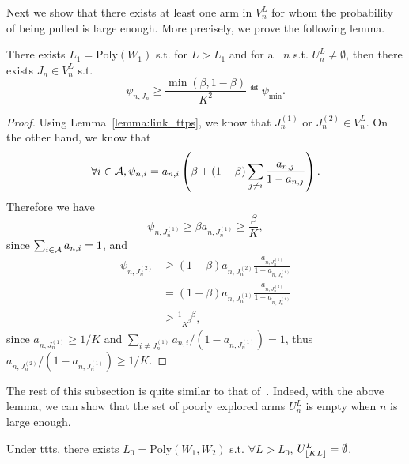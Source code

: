 Next we show that there exists at least one arm in $V_n^L$ for whom the probability of being pulled is large enough. More precisely, we prove the following lemma.

\begin{lemma}\label{lemma:psi_min_ttts}
\begin{leftbar}[lemmabar]
    There exists $L_1 = \text{Poly}(W_1)$ s.t. for $L > L_1$ and for all $n$ s.t. $U_n^L \neq \emptyset$, then there exists $J_n \in V_n^L$ s.t.
    \[
        \psi_{n,J_n} \geq \frac{\min(\beta,1-\beta)}{K^2} \eqdef \psi_{\min}.
    \]
\end{leftbar}
\end{lemma}

\begin{proof}
    Using Lemma~\ref{lemma:link_ttps}, we know that $J_n^{(1)}$ or $J_n^{(2)} \in V_n^L$. On the other hand, we know that
    \[
        \forall i\in\mathcal{A}, \psi_{n,i} = a_{n,i} \left(\beta + (1-\beta) \sum_{j\neq i} \frac{a_{n,j}}{1-a_{n,j}}\right).
    \]
    Therefore we have
    \[
        \psi_{n,J_n^{(1)}} \geq \beta a_{n,J_n^{(1)}} \geq \frac{\beta}{K},
    \]
    since $\sum_{i\in\mathcal{A}} a_{n,i} = 1$, and
    \begin{align*}
        \psi_{n,J_n^{(2)}} &\geq (1-\beta) a_{n,J_n^{(2)}} \frac{a_{n,J_n^{(1)}}}{1-a_{n,J_n^{(1)}}}\\
                           &= (1-\beta) a_{n,J_n^{(1)}} \frac{a_{n,J_n^{(2)}}}{1-a_{n,J_n^{(1)}}}\\
                           &\geq \frac{1-\beta}{K^2},
    \end{align*}
    since $a_{n,J_n^{(1)}} \geq 1/K$ and $\sum_{i\neq J_n^{(1)}} a_{n,i}/(1-a_{n,J_n^{(1)}}) = 1 $, thus $a_{n,J_n^{(2)}}/(1-a_{n,J_n^{(1)}}) \geq 1/K$.
\end{proof}

The rest of this subsection is quite similar to that of~\cite{qin2017ttei}. Indeed, with the above lemma, we can show that the set of poorly explored arms $U_n^L$ is empty when $n$ is large enough.

\begin{lemma}\label{lemma:poorly_explored_ttts}
\begin{leftbar}[lemmabar]
    Under \gls{ttts}, there exists $L_0 = \text{Poly}(W_1,W_2)$ s.t. $\forall L > L_0$, $U_{\lfloor KL\rfloor}^L = \emptyset$.
\end{leftbar}
\end{lemma}


